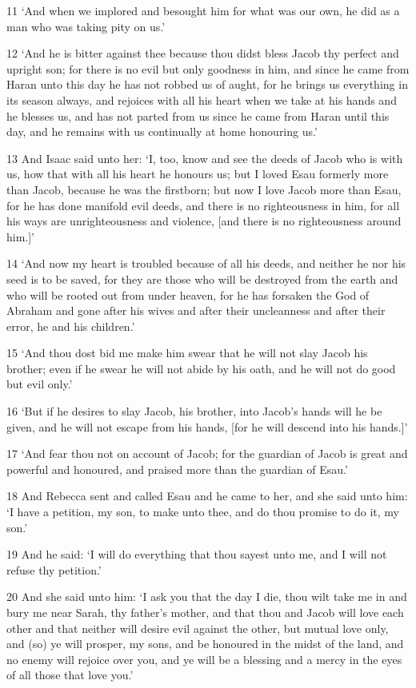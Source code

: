 \par 11 ‘And when we implored and besought him for what was our own, he did as a man who was taking pity on us.’
\par 12 ‘And he is bitter against thee because thou didst bless Jacob thy perfect and upright son; for there is no evil but only goodness in him, and since he came from Haran unto this day he has not robbed us of aught, for he brings us everything in its season always, and rejoices with all his heart when we take at his hands and he blesses us, and has not parted from us since he came from Haran until this day, and he remains with us continually at home honouring us.’
\par 13 And Isaac said unto her: ‘I, too, know and see the deeds of Jacob who is with us, how that with all his heart he honours us; but I loved Esau formerly more than Jacob, because he was the firstborn; but now I love Jacob more than Esau, for he has done manifold evil deeds, and there is no righteousness in him, for all his ways are unrighteousness and violence, [and there is no righteousness around him.]’
\par 14 ‘And now my heart is troubled because of all his deeds, and neither he nor his seed is to be saved, for they are those who will be destroyed from the earth and who will be rooted out from under heaven, for he has forsaken the God of Abraham and gone after his wives and after their uncleanness and after their error, he and his children.’
\par 15 ‘And thou dost bid me make him swear that he will not slay Jacob his brother; even if he swear he will not abide by his oath, and he will not do good but evil only.’
\par 16 ‘But if he desires to slay Jacob, his brother, into Jacob's hands will he be given, and he will not escape from his hands, [for he will descend into his hands.]’
\par 17 ‘And fear thou not on account of Jacob; for the guardian of Jacob is great and powerful and honoured, and praised more than the guardian of Esau.’
\par 18 And Rebecca sent and called Esau and he came to her, and she said unto him: ‘I have a petition, my son, to make unto thee, and do thou promise to do it, my son.’
\par 19 And he said: ‘I will do everything that thou sayest unto me, and I will not refuse thy petition.’
\par 20 And she said unto him: ‘I ask you that the day I die, thou wilt take me in and bury me near Sarah, thy father's mother, and that thou and Jacob will love each other and that neither will desire evil against the other, but mutual love only, and (so) ye will prosper, my sons, and be honoured in the midst of the land, and no enemy will rejoice over you, and ye will be a blessing and a mercy in the eyes of all those that love you.’

